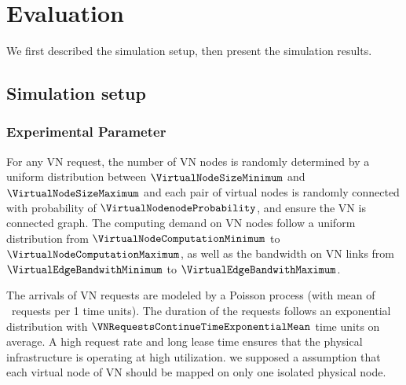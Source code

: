 
\section{Evaluation}
\label{sec:Evaluation}
We first described the simulation setup, then present the simulation results.

\subsection{Simulation setup}

\subsubsection{Experimental Parameter}
For any VN request, the number of VN nodes is randomly determined by a uniform distribution between $\VirtualNodeSizeMinimum$ and $\VirtualNodeSizeMaximum$ and each pair of virtual nodes is randomly connected with probability of $\VirtualNodenodeProbability$, and ensure the VN is connected graph. The computing demand on VN nodes follow a uniform distribution from $\VirtualNodeComputationMinimum$ to $\VirtualNodeComputationMaximum$, as well as the bandwidth on VN links from $\VirtualEdgeBandwithMinimum$ to $\VirtualEdgeBandwithMaximum$.

The arrivals of VN requests are modeled by a Poisson process (with mean of \PossionMean \ requests per 1 time units).
The duration of the requests follows an exponential distribution with $\VNRequestsContinueTimeExponentialMean$ time units on average.
A high request rate and long lease time ensures that the physical infrastructure is operating at high utilization. we supposed a assumption that each virtual node of VN should be mapped on only one isolated  physical node.

